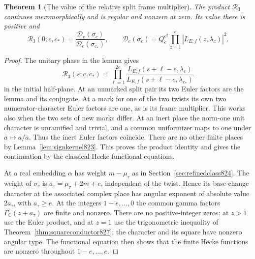 \documentclass[a4paper,11pt]{article}
\newtheorem{theorem}[proposition]{Theorem}
\theoremstyle{definition}
\theoremstyle{remark}
\numberwithin{equation}{section}
\begin{document}
\begin{theorem}[The value of the relative split frame multiplier]
\leavevmode\label{thm:thirdsplitprod836}
The product \(\mathcal R_3\) continues meromorphically and is
regular and nonzero at zero. Its value there is positive and
\[
       \mathcal R_3(0;c,c_*)=
       \frac{\mathcal D_e(\sigma_c)}
            {\mathcal D_e(\sigma_{c_*})},\qquad
 \mathcal D_e(\sigma_c)=Q_c^{e^2}
             \prod_{z=1}^e|L_{E,f}(z,\lambda_c)|^2 .
\]
\end{theorem}
\begin{proof}
The unitary phase in the lemma gives
\[
 \mathcal R_3(s;c,c_*)=
 \prod_{\ell=1}^{2e}
       \frac{L_{E,f}(s+\ell-e,\lambda_c)}
            {L_{E,f}(s+\ell-e,\lambda_{c_*})}
\]
in the initial half-plane. At an unmarked split pair its two
Euler factors are the lemma and its conjugate. At a mark for
one of the two twists its own two numerator-character Euler
factors are one, as is its frame multiplier. This works
also when the two sets of new marks differ. At an inert
place the norm-one unit character is unramified and trivial,
and a common uniformizer maps to one under \(a\mapsto a/\bar a\).
Thus the inert Euler factors coincide. There are no other
finite places by Lemma~\ref{lem:signkernel823}. This proves
the product identity and gives the continuation by the
classical Hecke functional equations.

At a real embedding \(\alpha\) has weight \(m-\mu_\tau\)
as in Section~\ref{sec:refinedclass824}. The weight of
\(\sigma_c\) is \(a_\tau=\mu_\tau+2m+e\), independent of
the twist. Hence its base-change character at the associated
complex place has angular exponent of absolute value
\(2a_\tau\), with \(a_\tau\ge e\). At the integers
\(1-e,\ldots,0\) the common gamma factors
\(\Gamma_{\mathbb C}(z+a_\tau)\) are finite and nonzero.
There are no positive-integer zeros: at \(z>1\) use the
Euler product, and at \(z=1\) use the trigonometric
inequality of Theorem~\ref{thm:squareconductor827};
the character and its square have nonzero angular type.
The functional equation then shows that the finite Hecke
functions are nonzero throughout \(1-e,\ldots,e\).


\end{proof}
\end{document}

